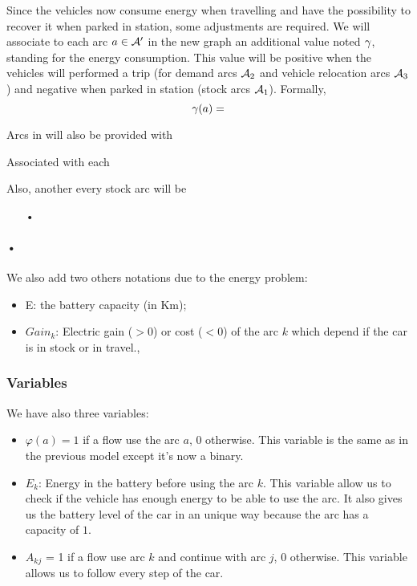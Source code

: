 \begin{bibunit}[ieeetr]
\medskip
Since the vehicles now consume energy when travelling and have the possibility to recover it when parked in station, some adjustments are required.
We will associate to each arc $a \in \mathcal{A}'$ in the new graph an additional value noted $\gamma$, standing for the energy consumption.
This value will be positive when the vehicles will performed a trip (\ie for demand arcs $\mathcal{A}_2$ and vehicle relocation arcs $\mathcal{A}_3$) and negative when parked in station (\ie stock arcs $\mathcal{A}_1$).
Formally,
\begin{equation}
\gamma(a) = 
\end{equation}





Arcs in will also be provided with 

Associated with each 

Also, another every stock arc will be 


\begin{enumerate}
\item[•]
\end{enumerate}

\paragraph{•}

We also add two others notations due to the energy problem:
\begin{itemize}
\item E: the battery capacity (in Km);
\item $Gain_k$: Electric gain ($>0$) or cost ($<0$) of the arc $k$ which depend if the car is in stock or in travel.,
\end{itemize}

\subsubsection{Variables}
We have also three variables:
\begin{itemize}
\item
$ \varphi (a) = 1 $ if a flow use the arc $a$, $0$ otherwise.
This variable is the same as in the previous model except it's now a binary.
\item
$E_k$: Energy in the battery before using the arc $k$.
This variable allow us to check if the vehicle has enough energy to be able to use the arc.
It also gives us the battery level of the car in an unique way because the arc has a capacity of $1$.
\item
$A_{kj}$ = 1 if a flow use arc $k$ and continue with arc $j$, $0$ otherwise.
This variable allows us to follow every step of the car.
\end{itemize}


\end{bibunit}
